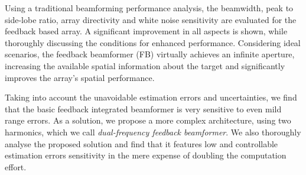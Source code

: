 Using a traditional beamforming performance analysis, the beamwidth, peak to side-lobe ratio, array directivity and white noise sensitivity are evaluated for the feedback based array.
A significant improvement in all aspects is shown, while thoroughly discussing the conditions for enhanced performance.
Considering ideal scenarios, the feedback beamformer (FB) virtually achieves an infinite aperture, increasing the available spatial information about the target and significantly improves the array's spatial performance.
\par
Taking into account the unavoidable estimation errors and uncertainties, we find that the basic feedback integrated beamformer is very sensitive to even mild range errors.
As a solution, we propose a more complex architecture, using two harmonics, which we call \emph{dual-frequency feedback beamformer}.
We also thoroughly analyse the proposed solution and find that it features low and controllable estimation errors sensitivity in the mere expense of doubling the computation effort.